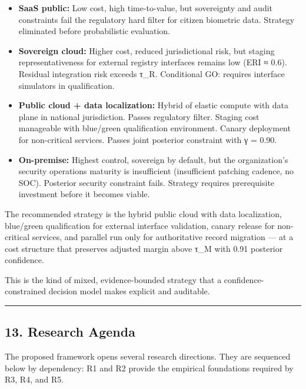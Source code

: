 \documentclass[
]{article}
\providecommand{\tightlist}{%
  \setlength{\itemsep}{0pt}\setlength{\parskip}{0pt}}
\begin{document}
\begin{itemize}
\tightlist
\item
  \textbf{SaaS public:} Low cost, high time-to-value, but sovereignty
  and audit constraints fail the regulatory hard filter for citizen
  biometric data. Strategy eliminated before probabilistic evaluation.
\item
  \textbf{Sovereign cloud:} Higher cost, reduced jurisdictional risk,
  but staging representativeness for external registry interfaces
  remains low (ERI ≈ 0.6). Residual integration risk exceeds τ\_R.
  Conditional GO: requires interface simulators in qualification.
\item
  \textbf{Public cloud + data localization:} Hybrid of elastic compute
  with data plane in national jurisdiction. Passes regulatory filter.
  Staging cost manageable with blue/green qualification environment.
  Canary deployment for non-critical services. Passes joint posterior
  constraint with γ = 0.90.
\item
  \textbf{On-premise:} Highest control, sovereign by default, but the
  organization's security operations maturity is insufficient
  (insufficient patching cadence, no SOC). Posterior security constraint
  fails. Strategy requires prerequisite investment before it becomes
  viable.
\end{itemize}

The recommended strategy is the hybrid public cloud with data
localization, blue/green qualification for external interface
validation, canary release for non-critical services, and parallel run
only for authoritative record migration --- at a cost structure that
preserves adjusted margin above τ\_M with 0.91 posterior confidence.

This is the kind of mixed, evidence-bounded strategy that a
confidence-constrained decision model makes explicit and auditable.

\begin{center}\rule{0.5\linewidth}{0.5pt}\end{center}

\subsection{13. Research Agenda}\label{research-agenda}

The proposed framework opens several research directions. They are
sequenced below by dependency: R1 and R2 provide the empirical
foundations required by R3, R4, and R5.
\end{document}
